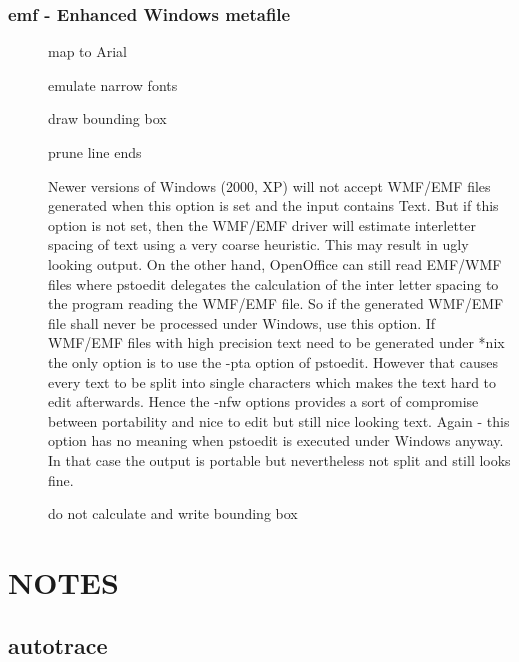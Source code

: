 \documentclass[english,a4paper]{article}
\begin{document}
\subsubsection{emf - Enhanced Windows metafile}
\begin{description}
\item[] 
map to Arial


\item[] 
emulate narrow fonts


\item[] 
draw bounding box


\item[] 
prune line ends


\item[] 
Newer versions of Windows (2000, XP) will not accept WMF/EMF files generated when this option is set and the input contains Text. But if this option is not set, then the WMF/EMF driver will estimate interletter spacing of text using a very coarse heuristic. This may result in ugly looking output. On the other hand, OpenOffice can still read EMF/WMF files where pstoedit delegates the calculation of the inter letter spacing to the program reading the WMF/EMF file. So if the generated WMF/EMF file shall never be processed under Windows, use this option. If WMF/EMF files with high precision text need to be generated under *nix the only option is to use the -pta option of pstoedit. However that causes every text to be split into single characters which makes the text hard to edit afterwards. Hence the -nfw options provides a sort of compromise between portability and nice to edit but still nice looking text. Again - this option has no meaning when pstoedit is executed under Windows anyway. In that case the output is portable but nevertheless not split and still looks fine.


\item[] 
do not calculate and write bounding box


\end{description}

\section{NOTES}


  \subsection{autotrace}
\end{document}
